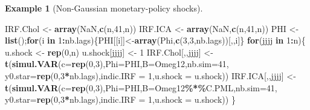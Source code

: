 \documentclass[
  12pt,
]{book}
\newenvironment{Shaded}{\begin{snugshade}}{\end{snugshade}}
\newcommand{\AttributeTok}[1]{\textcolor[rgb]{0.13,0.29,0.53}{#1}}
\newcommand{\ConstantTok}[1]{\textcolor[rgb]{0.56,0.35,0.01}{#1}}
\newcommand{\ControlFlowTok}[1]{\textcolor[rgb]{0.13,0.29,0.53}{\textbf{#1}}}
\newcommand{\DecValTok}[1]{\textcolor[rgb]{0.00,0.00,0.81}{#1}}
\newcommand{\FunctionTok}[1]{\textcolor[rgb]{0.13,0.29,0.53}{\textbf{#1}}}
\newcommand{\NormalTok}[1]{#1}
\newcommand{\OtherTok}[1]{\textcolor[rgb]{0.56,0.35,0.01}{#1}}
\newcommand{\SpecialCharTok}[1]{\textcolor[rgb]{0.81,0.36,0.00}{\textbf{#1}}}
\theoremstyle{definition}
\theoremstyle{definition}
\newtheorem{example}{Example}[chapter]
\theoremstyle{definition}
\theoremstyle{definition}
\theoremstyle{remark}
\begin{document}
\begin{example}[Non-Gaussian monetary-policy shocks]
\begin{Shaded}
\begin{Highlighting}[]
\NormalTok{IRF.Chol }\OtherTok{\textless{}{-}} \FunctionTok{array}\NormalTok{(}\ConstantTok{NaN}\NormalTok{,}\FunctionTok{c}\NormalTok{(n,}\DecValTok{41}\NormalTok{,n))}
\NormalTok{IRF.ICA  }\OtherTok{\textless{}{-}} \FunctionTok{array}\NormalTok{(}\ConstantTok{NaN}\NormalTok{,}\FunctionTok{c}\NormalTok{(n,}\DecValTok{41}\NormalTok{,n))}
\NormalTok{PHI }\OtherTok{\textless{}{-}} \FunctionTok{list}\NormalTok{();}\ControlFlowTok{for}\NormalTok{(i }\ControlFlowTok{in} \DecValTok{1}\SpecialCharTok{:}\NormalTok{nb.lags)\{PHI[[i]]}\OtherTok{\textless{}{-}}\FunctionTok{array}\NormalTok{(Phi,}\FunctionTok{c}\NormalTok{(}\DecValTok{3}\NormalTok{,}\DecValTok{3}\NormalTok{,nb.lags))[,,i]\}}
\ControlFlowTok{for}\NormalTok{(jjjj }\ControlFlowTok{in} \DecValTok{1}\SpecialCharTok{:}\NormalTok{n)\{}
\NormalTok{  u.shock }\OtherTok{\textless{}{-}} \FunctionTok{rep}\NormalTok{(}\DecValTok{0}\NormalTok{,n)}
\NormalTok{  u.shock[jjjj] }\OtherTok{\textless{}{-}} \DecValTok{1}
\NormalTok{  IRF.Chol[,,jjjj] }\OtherTok{\textless{}{-}} 
    \FunctionTok{t}\NormalTok{(}\FunctionTok{simul.VAR}\NormalTok{(}\AttributeTok{c=}\FunctionTok{rep}\NormalTok{(}\DecValTok{0}\NormalTok{,}\DecValTok{3}\NormalTok{),}\AttributeTok{Phi=}\NormalTok{PHI,}\AttributeTok{B=}\NormalTok{Omeg12,}\AttributeTok{nb.sim=}\DecValTok{41}\NormalTok{,}
                \AttributeTok{y0.star=}\FunctionTok{rep}\NormalTok{(}\DecValTok{0}\NormalTok{,}\DecValTok{3}\SpecialCharTok{*}\NormalTok{nb.lags),}\AttributeTok{indic.IRF =} \DecValTok{1}\NormalTok{,}\AttributeTok{u.shock =}\NormalTok{ u.shock))}
\NormalTok{  IRF.ICA[,,jjjj]  }\OtherTok{\textless{}{-}} 
    \FunctionTok{t}\NormalTok{(}\FunctionTok{simul.VAR}\NormalTok{(}\AttributeTok{c=}\FunctionTok{rep}\NormalTok{(}\DecValTok{0}\NormalTok{,}\DecValTok{3}\NormalTok{),}\AttributeTok{Phi=}\NormalTok{PHI,}\AttributeTok{B=}\NormalTok{Omeg12}\SpecialCharTok{\%*\%}\NormalTok{C.PML,}\AttributeTok{nb.sim=}\DecValTok{41}\NormalTok{,}
                \AttributeTok{y0.star=}\FunctionTok{rep}\NormalTok{(}\DecValTok{0}\NormalTok{,}\DecValTok{3}\SpecialCharTok{*}\NormalTok{nb.lags),}\AttributeTok{indic.IRF =} \DecValTok{1}\NormalTok{,}\AttributeTok{u.shock =}\NormalTok{ u.shock))}
\NormalTok{\}}
\end{Highlighting}
\end{Shaded}


\end{example}
\end{document}
